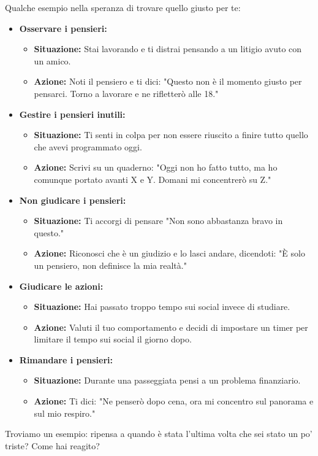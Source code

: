 \documentclass[12pt]{book} %
\begin{document}
\begin{mdframed}[linewidth=1pt]
Qualche esempio nella speranza di trovare quello giusto per te:
\begin{itemize}
    \item \textbf{Osservare i pensieri:} 
    \begin{itemize}
        \item \textbf{Situazione:} Stai lavorando e ti distrai pensando a un litigio avuto con un amico.
        \item \textbf{Azione:} Noti il pensiero e ti dici: "Questo non è il momento giusto per pensarci. Torno a lavorare e ne rifletterò alle 18."
    \end{itemize}

    \item \textbf{Gestire i pensieri inutili:} 
    \begin{itemize}
        \item \textbf{Situazione:} Ti senti in colpa per non essere riuscito a finire tutto quello che avevi programmato oggi.
        \item \textbf{Azione:} Scrivi su un quaderno: "Oggi non ho fatto tutto, ma ho comunque portato avanti X e Y. Domani mi concentrerò su Z."
    \end{itemize}

    \item \textbf{Non giudicare i pensieri:} 
    \begin{itemize}
        \item \textbf{Situazione:} Ti accorgi di pensare "Non sono abbastanza bravo in questo."
        \item \textbf{Azione:} Riconosci che è un giudizio e lo lasci andare, dicendoti: "È solo un pensiero, non definisce la mia realtà."
    \end{itemize}

    \item \textbf{Giudicare le azioni:} 
    \begin{itemize}
        \item \textbf{Situazione:} Hai passato troppo tempo sui social invece di studiare.
        \item \textbf{Azione:} Valuti il tuo comportamento e decidi di impostare un timer per limitare il tempo sui social il giorno dopo.
    \end{itemize}

    \item \textbf{Rimandare i pensieri:} 
    \begin{itemize}
        \item \textbf{Situazione:} Durante una passeggiata pensi a un problema finanziario.
        \item \textbf{Azione:} Ti dici: "Ne penserò dopo cena, ora mi concentro sul panorama e sul mio respiro."
    \end{itemize}
\end{itemize}

Troviamo un esempio: ripensa a quando è stata l'ultima volta che sei stato un po' triste? Come hai reagito?
\end{mdframed}
\end{document}
